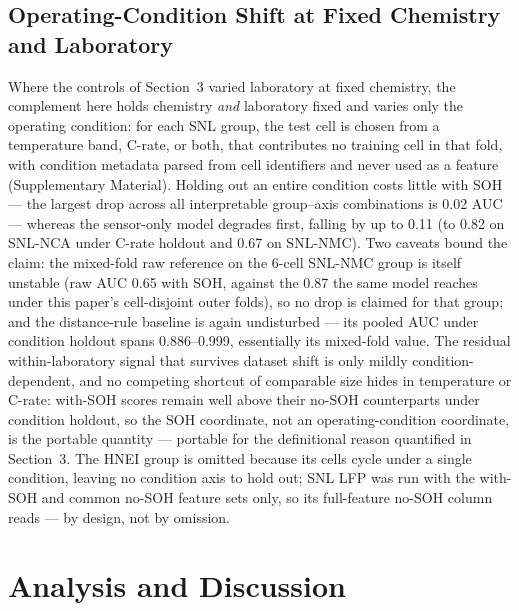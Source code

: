 \documentclass[11pt,a4paper]{article}
\begin{document}
\subsection{Operating-Condition Shift at Fixed Chemistry and Laboratory}
Where the controls of Section~3 varied laboratory at fixed chemistry, the complement here holds chemistry \emph{and} laboratory fixed and varies only the operating condition: for each SNL group, the test cell is chosen from a temperature band, C-rate, or both, that contributes no training cell in that fold, with condition metadata parsed from cell identifiers and never used as a feature (Supplementary Material). Holding out an entire condition costs little with SOH --- the largest drop across all interpretable group--axis combinations is 0.02 AUC --- whereas the sensor-only model degrades first, falling by up to 0.11 (to 0.82 on SNL-NCA under C-rate holdout and 0.67 on SNL-NMC). Two caveats bound the claim: the mixed-fold raw reference on the 6-cell SNL-NMC group is itself unstable (raw AUC 0.65 with SOH, against the 0.87 the same model reaches under this paper's cell-disjoint outer folds), so no drop is claimed for that group; and the distance-rule baseline is again undisturbed --- its pooled AUC under condition holdout spans 0.886--0.999, essentially its mixed-fold value. The residual within-laboratory signal that survives dataset shift is only mildly condition-dependent, and no competing shortcut of comparable size hides in temperature or C-rate: with-SOH scores remain well above their no-SOH counterparts under condition holdout, so the SOH coordinate, not an operating-condition coordinate, is the portable quantity --- portable for the definitional reason quantified in Section~3. The HNEI group is omitted because its cells cycle under a single condition, leaving no condition axis to hold out; SNL LFP was run with the with-SOH and common no-SOH feature sets only, so its full-feature no-SOH column reads --- by design, not by omission.

\section{Analysis and Discussion}
\end{document}
